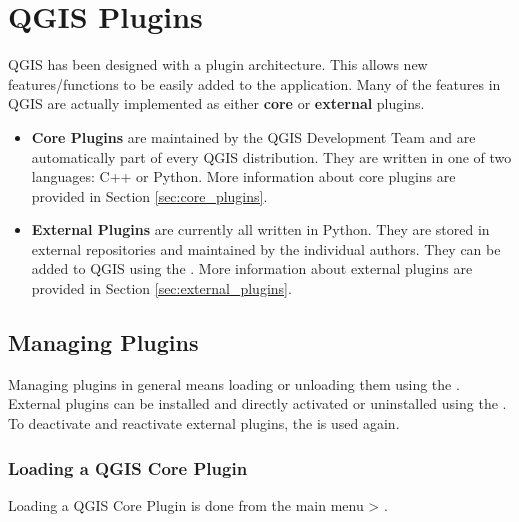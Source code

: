 
\chapter{QGIS Plugins}\label{sec:plugins}


QGIS has been designed with a plugin architecture.
This allows new features/functions to be easily added to the application.
Many of the features in QGIS are actually implemented as either \textbf{core} 
or \textbf{external} plugins. 

\begin{itemize}[label=--]
\item \textbf{Core Plugins} are maintained by the QGIS Development 
Team and are automatically part of every QGIS distribution.
They are written in one of two languages: C++ or Python.
More information about core plugins are provided in Section \ref{sec:core_plugins}.
\item \textbf{External Plugins} are currently all written in Python.
They are stored in external repositories and maintained by the individual authors.
They can be added to QGIS using the .
More information about external plugins are provided in Section \ref{sec:external_plugins}.
\end{itemize}

\section{Managing Plugins}\label{sec:managing_plugins}

Managing plugins in general means loading or unloading them using 
the . External plugins can be installed and 
directly activated or uninstalled using the . To deactivate and reactivate external plugins, the 
 is used again.

\subsection{Loading a QGIS Core Plugin}\label{sec:load_core_plugin} 

Loading a QGIS Core Plugin is done from the main menu  
> .

